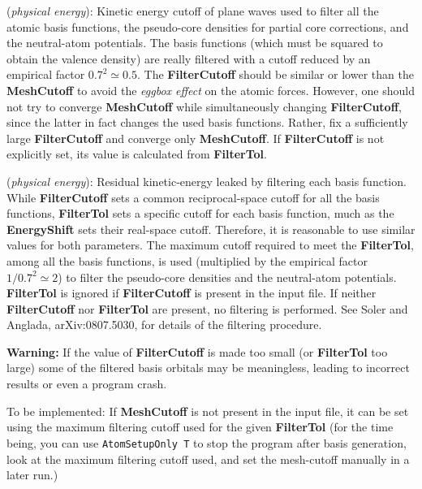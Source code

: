 \documentclass[11pt]{article}
\begin{document}
\begin{description}
\itemsep 10pt
\parsep 0pt

\item[{\bf FilterCutoff}] ({\it physical energy}):
Kinetic energy cutoff of plane waves used to filter all the
atomic basis functions, the pseudo-core densities
for partial core corrections, and the neutral-atom potentials.
The basis functions (which must be squared to obtain the
valence density) are really filtered with a cutoff reduced by an
empirical factor $0.7^2 \simeq 0.5$. The \textbf{FilterCutoff} should
be similar or lower than the \textbf{MeshCutoff} to avoid the
{\it eggbox effect} on the atomic forces.
However, one should
not try to converge \textbf{MeshCutoff} while simultaneously
changing \textbf{FilterCutoff}, since the latter in fact changes
the used basis functions. Rather, fix a sufficiently large
\textbf{FilterCutoff} and converge only \textbf{MeshCutoff}.
If \textbf{FilterCutoff} is not explicitly set, its value is
calculated from \textbf{FilterTol}.

\item[{\bf FilterTol}] ({\it physical energy}):
Residual kinetic-energy leaked by filtering each basis function.
While \textbf{FilterCutoff} sets a common reciprocal-space cutoff
for all the basis functions, \textbf{FilterTol} sets a specific 
cutoff for each basis function, much as the \textbf{EnergyShift}
sets their real-space cutoff. Therefore,
it is reasonable to use similar values for both parameters.
The maximum cutoff required to meet the \textbf{FilterTol},
among all the basis functions, is used (multiplied by the
empirical factor $1/0.7^2 \simeq 2$) to filter the pseudo-core
densities and the neutral-atom potentials. \textbf{FilterTol} is ignored if
\textbf{FilterCutoff} is present in the input file.
If neither \textbf{FilterCutoff} nor \textbf{FilterTol} are
present, no filtering is performed.
See Soler and Anglada, arXiv:0807.5030, for details of the
filtering procedure.

{\bf Warning:} If the value of \textbf{FilterCutoff} is
made too small (or \textbf{FilterTol} too large) some of
the filtered basis orbitals may be meaningless, leading to
incorrect results or even a program crash.

To be implemented: If \textbf{MeshCutoff} is not present in the input
file, it can be set using the maximum filtering cutoff used for the given 
\textbf{FilterTol} (for the time being, you can use {\tt AtomSetupOnly T} 
to stop the program after basis generation, look at the maximum filtering
cutoff used, and set the mesh-cutoff manually in a later run.)

\end{description}
\end{document}

